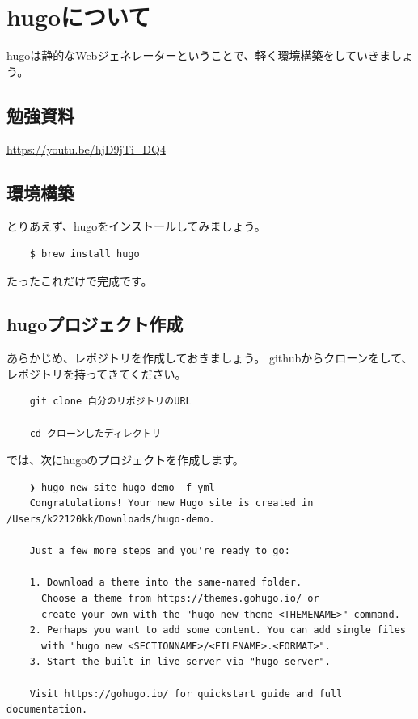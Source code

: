 \chapter{hugoについて}
hugoは静的なWebジェネレーターということで、軽く環境構築をしていきましょう。

\section{勉強資料}
  \url{https://youtu.be/hjD9jTi_DQ4}

\section{環境構築}
とりあえず、hugoをインストールしてみましょう。

  \begin{shaded}
    \begin{verbatim}
    $ brew install hugo
    \end{verbatim}
  \end{shaded}
  たったこれだけで完成です。

\section{hugoプロジェクト作成}
  あらかじめ、レポジトリを作成しておきましょう。
  githubからクローンをして、レポジトリを持ってきてください。

  \begin{shaded}
    \begin{verbatim}
    git clone 自分のリポジトリのURL

    cd クローンしたディレクトリ
    \end{verbatim}
  \end{shaded}

    では、次にhugoのプロジェクトを作成します。

  \begin{shaded}
    \begin{verbatim}
    ❯ hugo new site hugo-demo -f yml
    Congratulations! Your new Hugo site is created in /Users/k22120kk/Downloads/hugo-demo.

    Just a few more steps and you're ready to go:

    1. Download a theme into the same-named folder.
      Choose a theme from https://themes.gohugo.io/ or
      create your own with the "hugo new theme <THEMENAME>" command.
    2. Perhaps you want to add some content. You can add single files
      with "hugo new <SECTIONNAME>/<FILENAME>.<FORMAT>".
    3. Start the built-in live server via "hugo server".

    Visit https://gohugo.io/ for quickstart guide and full documentation.
    \end{verbatim}
  \end{shaded}

